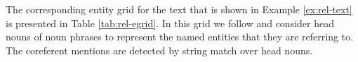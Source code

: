 




The corresponding entity grid for the text that is shown in Example \ref{ex:rel-text} is presented in Table \ref{tab:rel-egrid}. 
In this grid we follow  and consider head nouns of noun phrases to represent the named entities that they are referring to. 
The coreferent mentions are detected by string match over head nouns. 

